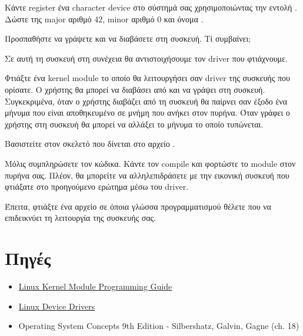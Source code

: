 \documentclass[18pt]{extarticle}
\begin{document}
\begin{question}
    Κάντε register ένα character device στο σύστημά σας χρησιμοποιώντας την εντολή . 
    Δώστε της major αριθμό 42, minor αριθμό 0 και όνομα . 

    Προσπαθήστε να γράψετε και να διαβάσετε στη συσκευή. Τί συμβαίνει;

    \begin{info}[Σημείωση]
        Σε αυτή τη συσκευή στη συνέχεια θα αντιστοιχήσουμε τον driver που φτιάχνουμε.
    \end{info}
\end{question}

\begin{question}
   Φτιάξτε ένα kernel module το οποίο θα λειτουργήσει σαν driver της συσκευής που ορίσατε.
   Ο χρήστης θα μπορεί να διαβάσει από και να γράψει στη συσκευή. 
   Συγκεκριμένα, όταν ο χρήστης διαβάζει από τη συσκευή θα παίρνει σαν έξοδο ένα μήνυμα που είναι αποθηκευμένο σε μνήμη που ανήκει στον πυρήνα.
   Όταν γράφει ο χρήστης στη συσκευή θα μπορεί να αλλάξει το μήνυμα το οποίο τυπώνεται.

   Βασιστείτε στον σκελετό που δίνεται στο αρχείο {\bf {}}.

    \begin{info}
        Μόλις συμπληρώσετε τον κώδικα. Κάντε τον compile και φορτώστε το module  στον πυρήνα σας.
        Πλέον, θα μπορείτε να αλληλεπιδράσετε με την εικονική συσκευή που φτιάξατε στο προηγούμενο ερώτημα μέσω του driver.
    \end{info}

   Έπειτα, φτιάξτε ένα αρχείο σε όποια γλώσσα προγραμματισμού θέλετε που να επιδεικνύει τη λειτουργία της συσκευής σας.
\end{question}


\section{Πηγές}

\begin{itemize}
    \item \href{https://sysprog21.github.io/lkmpg/}{Linux Kernel Module Programming Guide}
    \item \href{https://lwn.net/Kernel/LDD3/}{Linux Device Drivers}
    \item Operating System Concepts 9th Edition - Silbershatz, Galvin, Gagne (ch. 18)
\end{itemize}
\end{document}
